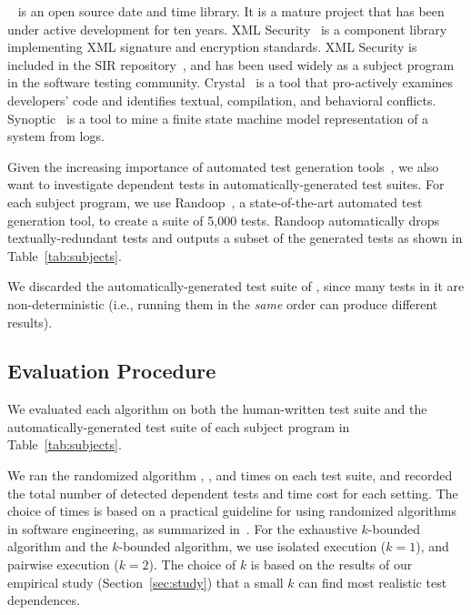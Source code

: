 \jt~\cite{jodatime} is an open source
date and time library. It is a mature project that
has been under active development
for ten years. XML Security~\cite{xmlsecurity}
is a component library implementing XML signature and encryption
standards. XML Security is included in
the SIR repository~\cite{sir}, and has been used widely
as a subject program in the software testing community.
Crystal~\cite{crystal} is a tool that
pro-actively examines developers' code and
identifies textual, compilation, and behavioral conflicts.
Synoptic~\cite{synoptic} is a tool to mine a finite state
machine model representation of a system from logs.

Given the increasing importance of automated test generation
tools~\cite{PachecoLET2007, ZhangSBE2011, Csallner:2004, fraseretal:ISSTA:2011},
we also want to investigate dependent tests in automatically-generated
test suites. For each subject program, we use
Randoop~\cite{PachecoLET2007}, a state-of-the-art automated
test generation tool, to create a suite of 5,000 tests.
Randoop automatically drops textually-redundant tests 
and outputs a subset of the generated tests as
shown in Table~\ref{tab:subjects}.

We discarded the automatically-generated test suite of
\jt, since many tests in it are non-deterministic (i.e., 
running them in the \textit{same} order
can produce different results).


\subsection{Evaluation Procedure}

We evaluated each algorithm 
on both the human-written test suite 
and the automatically-generated test suite
of each subject program in Table~\ref{tab:subjects}.


We ran the randomized algorithm \smalltrialnum, \mediumtrialnum,
and \trialnum times on each test suite, and recorded
the total number of detected dependent tests and time cost
for each setting. The choice of \trialnum times is based
on a practical guideline for using randomized algorithms
in software engineering, as summarized in~\cite{Arcuri:2011}.
%
For the exhaustive $k$-bounded algorithm
and the \dependenceaware{} $k$-bounded algorithm,
we use isolated execution ($k = 1$), and
pairwise execution ($k = 2$). The choice of $k$ is
based on the results of our empirical
study (Section~\ref{sec:study}) that a small $k$
can find most realistic test dependences.

